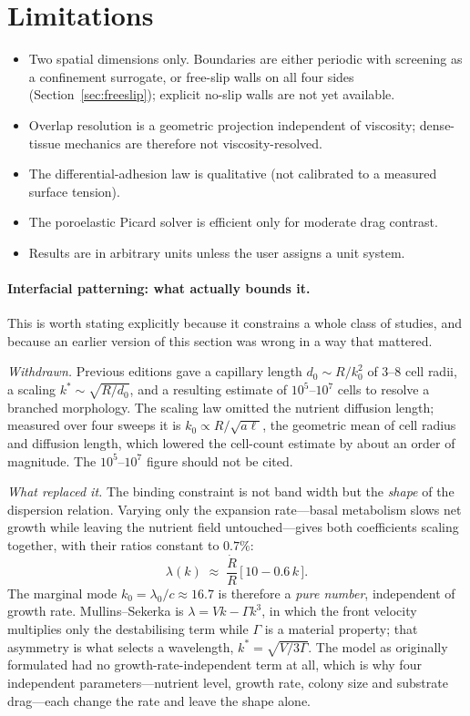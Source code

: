 \documentclass[11pt]{article}
\begin{document}
\section{Limitations}\label{sec:limits}

\begin{itemize}
  \item Two spatial dimensions only. Boundaries are either periodic with
        screening as a confinement surrogate, or free-slip walls on all four
        sides (Section~\ref{sec:freeslip}); explicit no-slip walls are not yet
        available.
  \item Overlap resolution is a geometric projection independent of viscosity;
        dense-tissue mechanics are therefore not viscosity-resolved.
  \item The differential-adhesion law is qualitative (not calibrated to a
        measured surface tension).
  \item The poroelastic Picard solver is efficient only for moderate drag
        contrast.
  \item Results are in arbitrary units unless the user assigns a unit system.
\end{itemize}

\paragraph{Interfacial patterning: what actually bounds it.}
This is worth stating explicitly because it constrains a whole class of studies,
and because an earlier version of this section was wrong in a way that mattered.

\emph{Withdrawn.} Previous editions gave a capillary length $d_0\sim R/k_0^2$ of
$3$--$8$ cell radii, a scaling $k^\ast\sim\sqrt{R/d_0}$, and a resulting estimate
of $10^5$--$10^7$ cells to resolve a branched morphology. The scaling law omitted
the nutrient diffusion length; measured over four sweeps it is
$k_0 \propto R/\sqrt{a\ell}$, the geometric mean of cell radius and diffusion
length, which lowered the cell-count estimate by about an order of magnitude. The
$10^5$--$10^7$ figure should not be cited.

\emph{What replaced it.} The binding constraint is not band width but the
\emph{shape} of the dispersion relation. Varying only the expansion rate---basal
metabolism slows net growth while leaving the nutrient field untouched---gives
both coefficients scaling together, with their ratios constant to $0.7\%$:
\begin{equation}
  \lambda(k) \;\approx\; \frac{\dot R}{R}\,\bigl[\,10 - 0.6\,k\,\bigr] .
\end{equation}
The marginal mode $k_0=\lambda_0/c\approx 16.7$ is therefore a \emph{pure
number}, independent of growth rate. Mullins--Sekerka is
$\lambda = Vk - \Gamma k^3$, in which the front velocity multiplies only the
destabilising term while $\Gamma$ is a material property; that asymmetry is what
selects a wavelength, $k^\ast=\sqrt{V/3\Gamma}$. The model as originally
formulated had no growth-rate-independent term at all, which is why four
independent parameters---nutrient level, growth rate, colony size and substrate
drag---each change the rate and leave the shape alone.
\end{document}

